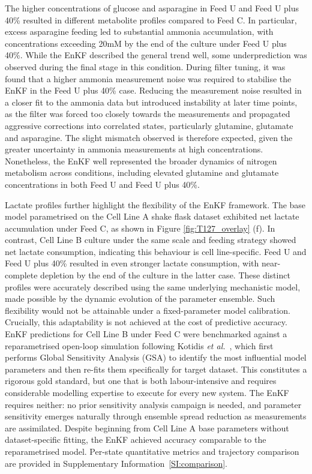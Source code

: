 The higher concentrations of glucose and asparagine in Feed U and Feed U plus 40\% resulted in different metabolite profiles compared to Feed C. In particular, excess asparagine feeding led to substantial ammonia accumulation, with concentrations exceeding 20mM by the end of the culture under Feed U plus 40\%. While the EnKF described the general trend well, some underprediction was observed during the final stage in this condition. During filter tuning, it was found that a higher ammonia measurement noise was required to stabilise the EnKF in the Feed U plus 40\% case. Reducing the measurement noise resulted in a closer fit to the ammonia data but introduced instability at later time points, as the filter was forced too closely towards the measurements and propagated aggressive corrections into correlated states, particularly glutamine, glutamate and asparagine. The slight mismatch observed is therefore expected, given the greater uncertainty in ammonia measurements at high concentrations. Nonetheless, the EnKF well represented the broader dynamics of nitrogen metabolism across conditions, including elevated glutamine and glutamate concentrations in both Feed U and Feed U plus 40\%.


Lactate profiles further highlight the flexibility of the EnKF framework. The base model parametrised on the Cell Line A shake flask dataset exhibited net lactate accumulation under Feed C, as shown in Figure \ref{fig:T127_overlay} (f). In contrast, Cell Line B culture under the same scale and feeding strategy showed net lactate consumption, indicating this behaviour is cell line-specific. Feed U and Feed U plus 40\% resulted in even stronger lactate consumption, with near-complete depletion by the end of the culture in the latter case. These distinct profiles were accurately described using the same underlying mechanistic model, made possible by the dynamic evolution of the parameter ensemble. Such flexibility would not be attainable under a fixed-parameter model calibration. {\color{blue} Crucially, this adaptability is not achieved at the cost of predictive accuracy. EnKF predictions for Cell Line B under Feed C were benchmarked against a reparametrised open-loop simulation following Kotidis \textit{et al.}~\cite{Kotidis2019UseCultures}, which first performs Global Sensitivity Analysis (GSA) to identify the most influential model parameters and then re-fits them specifically for target dataset. This constitutes a rigorous gold standard, but one that is both labour-intensive and requires considerable modelling expertise to execute for every new system. The EnKF requires neither: no prior sensitivity analysis campaign is needed, and parameter sensitivity emerges naturally through ensemble spread reduction as measurements are assimilated. Despite beginning from Cell Line A base parameters without dataset-specific fitting, the EnKF achieved accuracy comparable to the reparametrised model. Per-state quantitative metrics and trajectory comparison are provided in Supplementary Information~\ref{SI:comparison}.}

